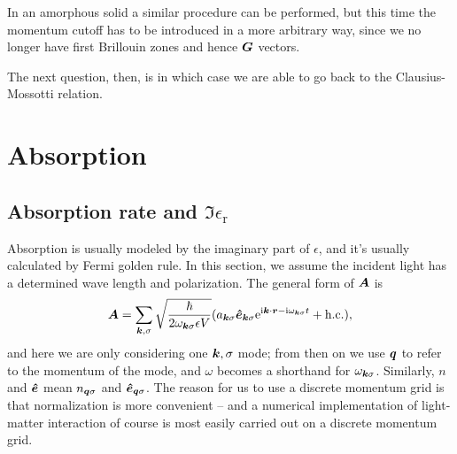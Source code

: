 \documentclass[hyperref, a4paper, 12pt]{report}
\newcommand*{\ii}{\mathrm{i}}
\newcommand*{\ee}{\mathrm{e}}
\begin{document}
In an amorphous solid a similar procedure can be performed, 
but this time the momentum cutoff has to be introduced 
in a more arbitrary way,
since we no longer have first Brillouin zones 
and hence $\vb*{G}$ vectors. 

The next question, then, is in which case we are able to go back to the Clausius-Mossotti relation.


\section{Absorption}

\subsection{Absorption rate and $\Im \epsilon_{\text{r}}$}

Absorption is usually modeled by the imaginary part of $\epsilon$,
and it's usually calculated by Fermi golden rule.
In this section, we assume the incident light 
has a determined wave length and polarization.
The general form of $\vb*{A}$ is 
\begin{equation}
    \vb*{A} = \sum_{\vb*{k}, \sigma}
        \sqrt{\frac{\hbar}{2 \omega_{\vb*{k} \sigma} \epsilon V}}
        (
            a_{\vb*{k} \sigma} \vu*{e}_{\vb*{k} \sigma} 
            \ee^{\ii \vb*{k} \cdot \vb*{r} - \ii \omega_{\vb*{k} \sigma} t}
            + \text{h.c.}
        ),
    \label{eq:a-and-photon}
\end{equation}
and here we are only considering one $\vb*{k}, \sigma$ mode; 
from then on we use $\vb*{q}$ to refer to the momentum of the mode,
and $\omega$ becomes a shorthand for $\omega_{\vb*{k} \sigma}$.
Similarly, $n$ and $\vu*{e}$ mean 
$n_{\vb*{q} \sigma}$ and $\vu*{e}_{\vb*{q} \sigma}$.
The reason for us to use a discrete momentum grid 
is that normalization is more convenient -- 
and a numerical implementation of light-matter interaction
of course is most easily carried out 
on a discrete momentum grid.
\end{document}
